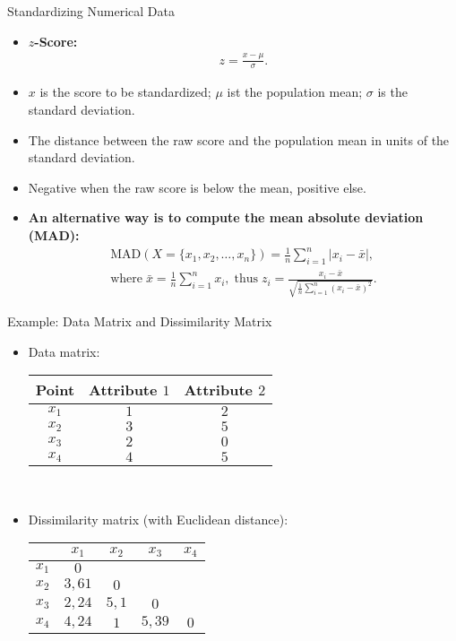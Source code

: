 \begin{frame}{Standardizing Numerical Data}
  \begin{itemize}
  \item \textbf{$z$-Score:}
    \begin{align*}
      z = \frac{x-\mu}{\sigma}.
    \end{align*}
  \item $x$ is the score to be standardized; $\mu$ ist the population mean; $\sigma$ is the standard deviation.
  \item The distance between the raw score and the population mean in units of the standard deviation.
  \item Negative when the raw score is below the mean, positive else.
  \item \textbf{An alternative way is to compute the mean absolute deviation (MAD):}
    \begin{align*}
      \text{MAD}(X = \{x_1,x_2,\ldots,x_n\}) = \frac{1}{n} \sum_{i=1}^{n} \vert x_i - \bar{x} \vert,\\
      \text{where} \; \bar{x} = \frac{1}{n} \sum_{i=1}^{n}x_i, \; \text{thus} \; z_i = \frac{x_i-\bar{x}}{\sqrt{\frac{1}{n}\sum_{i=1}^{n}(x_i-\bar{x})^2}}.
    \end{align*}
  \end{itemize}
\end{frame}

\begin{frame}{Example: Data Matrix and Dissimilarity Matrix}
  \begin{itemize}
  \item Data matrix: \\[0.1cm]
    \begin{tabular}{| c | c | c |}
      \hline
      Point & Attribute $1$ & Attribute $2$\\\hline
      $x_1$ & $1$ & $2$\\\hline
      $x_2$ & $3$ & $5$\\\hline
      $x_3$ & $2$ & $0$\\\hline
      $x_4$ & $4$ & $5$\\\hline
    \end{tabular}\\[0.5cm]
  \item Dissimilarity matrix (with Euclidean distance): \\[0.1cm]
    \begin{tabular}{| c | c | c | c | c |}
      \hline
      & $x_1$ & $x_2$ & $x_3$ & $x_4$\\\hline
      $x_1$ & $0$ & & & \\\hline
      $x_2$ & $3,61$ & $0$ & & \\\hline
      $x_3$ & $2,24$ & $5,1$ & $0$ & \\\hline
      $x_4$ & $4,24$ & $1$ & $5,39$ & $0$ \\\hline
    \end{tabular}\\[0.2cm]
  \end{itemize}
\end{frame}

